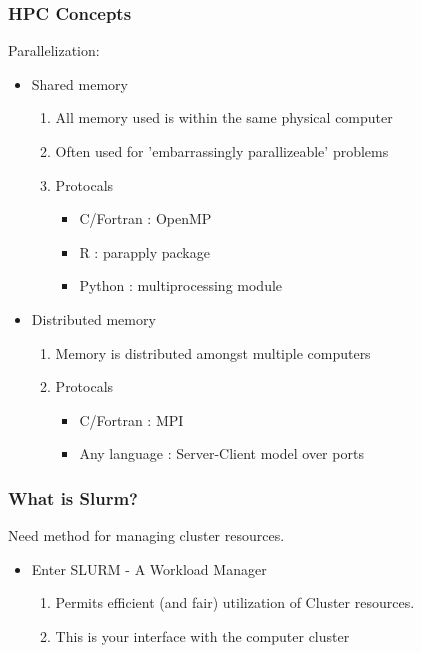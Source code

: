 \documentclass{beamer}
\begin{document}
\begin{frame}
\frametitle{HPC Concepts}
Parallelization:
\begin{itemize}
    \item Shared memory
        \begin{enumerate}
            \item All memory used is within the same physical computer
            \pause
            \item Often used for 'embarrassingly parallizeable' problems
            \pause 
            \item Protocals 
                \begin{itemize}
                    \item C/Fortran : OpenMP
                    \item R : parapply package
                    \item Python : multiprocessing module
                \end{itemize}
        \end{enumerate}
    
    \pause
    \bigskip
    \item Distributed memory
        \begin{enumerate}
            \item Memory is distributed amongst multiple computers
            \pause
            \item Protocals 
                \begin{itemize}
                    \item C/Fortran : MPI
                    \item Any language : Server-Client model over ports
                \end{itemize}
        \end{enumerate}
\end{itemize}
\end{frame}
 


\begin{frame}
\frametitle{What is Slurm?}
Need method for managing cluster resources.
\bigskip
\begin{itemize}
    \pause
    \item Enter SLURM - A Workload Manager
    \bigskip
    \pause
    \begin{enumerate}
        \item Permits efficient (and fair) utilization of Cluster resources.
        \pause
        \bigskip
        \item This is your interface with the computer cluster
    \end{enumerate}
\end{itemize}
\end{frame}
\end{document}
